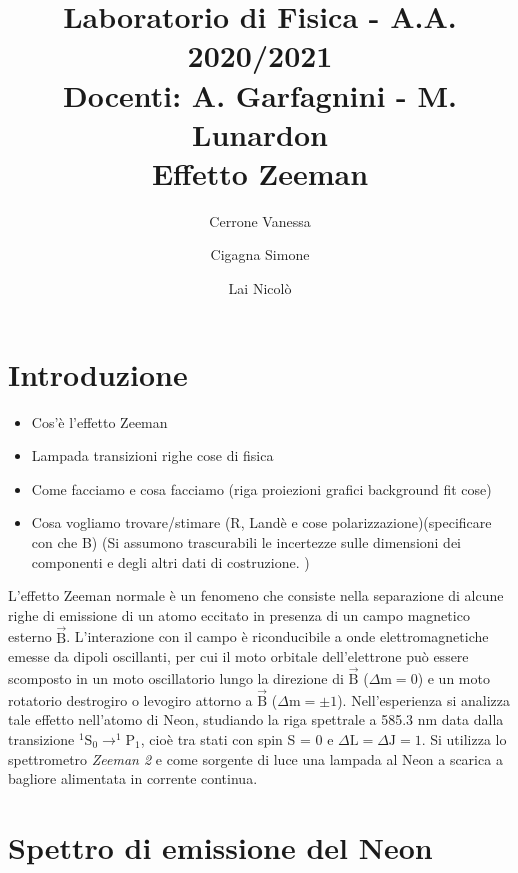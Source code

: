\documentclass[twocolumn,10pt]{asme2ej}
\date{}
\title{{\huge\bfseries Laboratorio di Fisica} - {\LARGE A.A. 2020/2021} \\ 
    {\LARGE Docenti: A. Garfagnini - M. Lunardon} \\ {\Huge\bfseries Effetto Zeeman}}
\author{Cerrone Vanessa
    \affiliation{
    1200361\\
    vanessa.cerrone@studenti.unipd.it
    }	
}
\author{Cigagna Simone
    \affiliation{
	1193992\\
    simone.cigagna@studenti.unipd.it
    }	
}
\author{Lai Nicolò
    \affiliation{
	1193976\\
    nicolo.lai@studenti.unipd.it
    }	
}
\begin{document}
\maketitle    


\section{Introduzione}

\begin{itemize}
    \item Cos'è l'effetto Zeeman
    \item Lampada transizioni righe cose di fisica
    \item Come facciamo e cosa facciamo (riga proiezioni grafici background fit cose) 
    \item Cosa vogliamo trovare/stimare (R, Landè e cose polarizzazione)(specificare con che B) (Si assumono trascurabili le incertezze sulle dimensioni dei componenti e degli altri dati di costruzione.
    )
\end{itemize}
L'effetto Zeeman normale è un fenomeno che consiste nella separazione di alcune righe di emissione di un atomo eccitato in presenza di un campo magnetico esterno $\vec{\text{B}}$. L'interazione con il campo è riconducibile a onde elettromagnetiche emesse da dipoli oscillanti, per cui il moto orbitale dell'elettrone può 
essere scomposto in un moto oscillatorio lungo la direzione di $\vec{\text{B}}$ ($\Delta \text{m} = 0$) e un moto rotatorio destrogiro o levogiro attorno a $\vec{\text{B}}$ ($\Delta \text{m} = \pm1$).
Nell'esperienza si analizza tale effetto nell'atomo di Neon, studiando la riga spettrale a 585.3 \si{\nano \metre} data dalla transizione $ ^1\text{S}_0 \rightarrow ^1\text{P}_1$, cioè tra stati con spin S = 0 e $\Delta \text{L}= \Delta \text{J} = 1$.
Si utilizza lo spettrometro \textit{Zeeman 2} e come sorgente di luce una lampada al Neon a scarica a bagliore alimentata in corrente continua. 






\section{Spettro di emissione del Neon}
\end{document}
